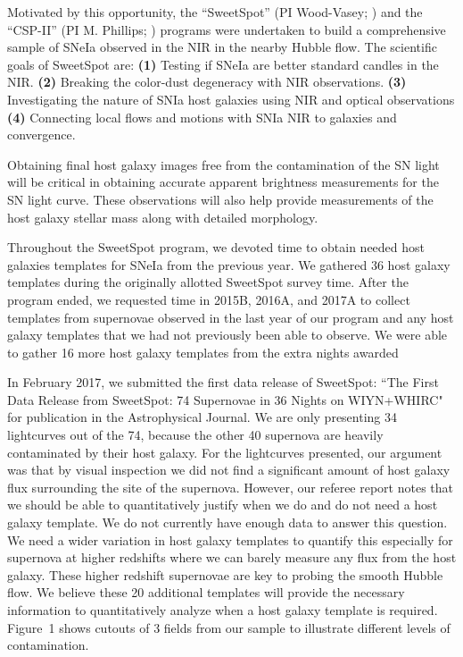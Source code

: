 \documentclass[11pt]{article}
\begin{document}
Motivated by this opportunity, the ``SweetSpot'' (PI Wood-Vasey; \cite{weyant14}) and the ``CSP-II'' (PI M. Phillips; \cite{contreras10,stritzinger11}) programs were undertaken to build a comprehensive sample of SNeIa observed in the NIR in the nearby Hubble flow.
The scientific goals of SweetSpot are:
{\bf (1)}
Testing if SNeIa are better standard candles in the NIR.
{\bf (2)}
Breaking the color-dust degeneracy with NIR observations.
{\bf (3)}
Investigating the nature of SNIa host galaxies using NIR and optical observations
{\bf (4)}
Connecting local flows and motions with SNIa NIR to galaxies and convergence.

Obtaining final host galaxy images free from the contamination of the SN light will be critical in obtaining accurate apparent brightness measurements for the SN light curve.  These observations will also help provide measurements of the host galaxy stellar mass along with detailed morphology.

Throughout the SweetSpot program, we devoted time to obtain needed host galaxies templates for SNeIa from the previous year.  
We gathered 36 host galaxy templates during the originally allotted SweetSpot survey time. 
After the program ended, we requested time in 2015B, 2016A, and 2017A to collect templates from supernovae observed in the last year of our program and any host galaxy templates that we had not previously been able to observe. 
We were able to gather 16 more host galaxy templates from the extra nights awarded 

In February 2017, we submitted the first data release of SweetSpot: ``The First Data Release from SweetSpot: 74 Supernovae in 36 Nights on WIYN+WHIRC"\cite{weyant17} for publication in the Astrophysical Journal. 
We are only presenting 34 lightcurves out of the 74, because the other 40 supernova are heavily contaminated by their host galaxy. 
For the lightcurves presented, our argument was that by visual inspection we did not find a significant amount of host galaxy flux surrounding the site of the supernova.
However, our referee report notes that we should be able to quantitatively justify when we do and do not need a host galaxy template. 
We do not currently have enough data to answer this question. 
We need a wider variation in host galaxy templates to quantify this especially for supernova at higher redshifts where we can barely measure any flux from the host galaxy.
These higher redshift supernovae are key to probing the smooth Hubble flow.
We believe these 20 additional templates will provide the necessary information to quantitatively analyze when a host galaxy template is required. 
Figure~1 shows cutouts of 3 fields from our sample to illustrate different levels of contamination.  
\end{document}
